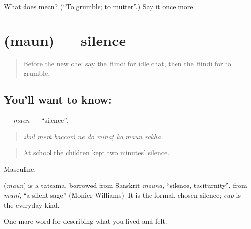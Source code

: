 \begin{tcolorbox}[breakable,colback=teal!4,colframe=teal!35!black,title={Before you move on}]
What does  mean? (\textquotedblleft{}To grumble; to mutter\textquotedblright{}.) Say it once more.
\end{tcolorbox}
\section[\texorpdfstring{\hi{मौन} (maun)}{मौन (maun)}]{ (maun) — silence}

\label{lesson:HI-C473-maun}



\begin{quote}
Before the new one: say the Hindi for idle chat, then the Hindi for to grumble.
\end{quote}

\subsection*{You'll want to know: }
\textbf{} — \emph{maun} — \textquotedblleft{}silence\textquotedblright{}.

\begin{quote}
        
\end{quote}

\begin{quote}
\emph{skūl meṁ baccoṁ ne do minaṭ kā maun rakhā.}
\end{quote}

\begin{quote}
At school the children kept two minutes' silence.
\end{quote}

Masculine.

\begin{cousinweb}
\textbf{} (\emph{maun}) is a tatsama, borrowed from Sanskrit \emph{mauna}, \textquotedblleft{}silence, taciturnity\textquotedblright{}, from \emph{muni}, \textquotedblleft{}a silent sage\textquotedblright{} (Monier-Williams). It is the formal, chosen silence; \emph{cup} is the everyday kind.
\end{cousinweb}

\begin{grammarlens}[title={What you've built}]
One more word for describing what you lived and felt.
\end{grammarlens}

